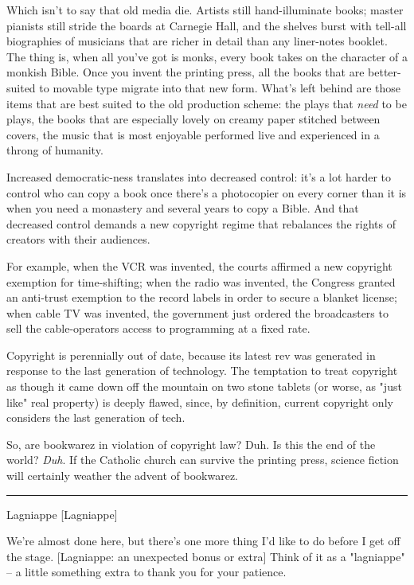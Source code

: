 Which isn't to say that old media die. Artists still
hand-illuminate books; master pianists still stride the boards at
Carnegie Hall, and the shelves burst with tell-all biographies of
musicians that are richer in detail than any liner-notes booklet.
The thing is, when all you've got is monks, every book takes on the
character of a monkish Bible. Once you invent the printing press,
all the books that are better-suited to movable type migrate into
that new form. What's left behind are those items that are best
suited to the old production scheme: the plays that \emph{need}
to be plays, the books that are especially lovely on creamy paper
stitched between covers, the music that is most enjoyable performed
live and experienced in a throng of humanity.

Increased democratic-ness translates into decreased control: it's a
lot harder to control who can copy a book once there's a
photocopier on every corner than it is when you need a monastery
and several years to copy a Bible. And that decreased control
demands a new copyright regime that rebalances the rights of
creators with their audiences.

For example, when the VCR was invented, the courts affirmed a new
copyright exemption for time-shifting; when the radio was invented,
the Congress granted an anti-trust exemption to the record labels
in order to secure a blanket license; when cable TV was invented,
the government just ordered the broadcasters to sell the
cable-operators access to programming at a fixed rate.

Copyright is perennially out of date, because its latest rev was
generated in response to the last generation of technology. The
temptation to treat copyright as though it came down off the
mountain on two stone tablets (or worse, as "just like" real
property) is deeply flawed, since, by definition, current copyright
only considers the last generation of tech.

So, are bookwarez in violation of copyright law? Duh. Is this the
end of the world? \emph{Duh}. If the Catholic church can survive
the printing press, science fiction will certainly weather the
advent of bookwarez.

\begin{center}\rule{3in}{0.4pt}\end{center}

Lagniappe [Lagniappe]

We're almost done here, but there's one more thing I'd like to do
before I get off the stage. [Lagniappe: an unexpected bonus or
extra] Think of it as a "lagniappe" -- a little something extra to
thank you for your patience.

